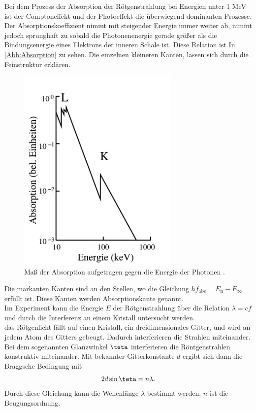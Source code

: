 Bei dem Prozess der Absorption der Rötgenstrahlung bei Energien unter
1 MeV ist der Comptoneffekt und der Photoeffekt die überwiegend dominanten
Prozesse.\\
Der Absorptionskoeffizient nimmt mit steigender Energie immer weiter ab,
nimmt jedoch sprunghaft zu sobald die Photonenenergie gerade größer als die
Bindungsenergie eines Elektrons der inneren Schale ist. Diese Relation ist In
\autoref{Abb:Absorption} zu sehen. Die einzelnen kleineren Kanten, lassen
sich durch die Feinstruktur erklären.\\
\begin{figure}
    \centering
    \includegraphics[width=0.7\textwidth]{Bilder/Absorption.png}
    \caption{Maß der Absorption aufgetragen gegen die Energie der Photonen \cite{sample}.}
    \label{Abb:Absorption}
\end{figure}
Die markanten Kanten sind an den Stellen, wo die Gleichung $h f_{\mathrm{abs}} = E_{\mathrm{n}} - E_{\infty}$
erfüllt ist. Diese Kanten werden Absorptionskante genannt.\\
Im Experiment kann die Energie $E$ der Rötgenstrahlung über die Relation $\lambda = cf$ und
durch die Interferenz an einem Kristall untersucht werden.\\
das Rötgenlicht fällt auf einen Kristall, ein dreidimensionales Gitter,
und wird an jedem Atom des Gitters gebeugt. Dadurch interferieren die 
Strahlen miteinander.\\
Bei dem sogenannten Glanzwinkel $\teta$ interferieren die Röntgenstrahlen konstruktiv
miteinander. Mit bekannter Gitterkonstante $d$ ergibt sich dann die Braggsche Bedingung mit
\begin{equation}
    2d \sin{\teta} = n \lambda.
\end{equation}
Durch diese Gleichung kann die Wellenlänge $\lambda$ bestimmt werden. $n$ ist 
die Beugungsordnung.\\
